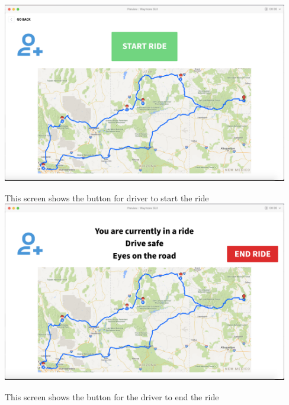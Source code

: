 \begin{center}

\includegraphics[width = 125mm, scale = 1]{images/3.png}

This screen shows the button for driver to start the ride\\

\includegraphics[width = 125mm, scale = 1]{images/4.png}

This screen shows the button for the driver to end the ride
\end{center}

